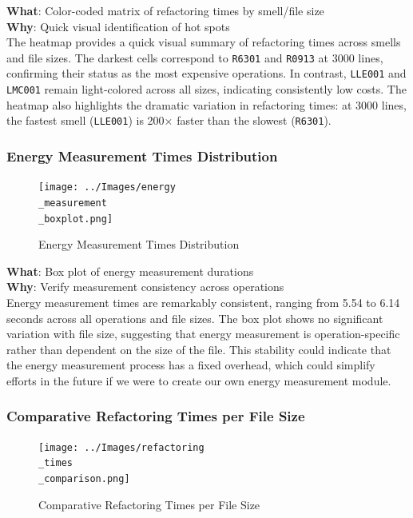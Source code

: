 \documentclass[12pt, titlepage]{article}
\begin{document}
\noindent \textbf{What}: Color-coded matrix of refactoring times by
smell/file size\\

\noindent \textbf{Why}: Quick visual identification of hot spots\\

The heatmap provides a quick visual summary of refactoring times
across smells and file sizes. The darkest cells correspond to
\texttt{R6301} and \texttt{R0913} at 3000 lines, confirming their
status as the most expensive operations. In contrast, \texttt{LLE001}
and \texttt{LMC001} remain light-colored across all sizes, indicating
consistently low costs. The heatmap also highlights the dramatic
variation in refactoring times: at 3000 lines, the fastest smell
(\texttt{LLE001}) is 200× faster than the slowest (\texttt{R6301}).

\subsubsection{Energy Measurement Times Distribution}
\begin{figure}[H]
  \centering
  \texttt{[image: ../Images/energy\\\_measurement\\\_boxplot.png]}
  \caption{Energy Measurement Times Distribution}
\end{figure}

\noindent \textbf{What}: Box plot of energy measurement durations\\

\noindent \textbf{Why}: Verify measurement consistency across operations\\

Energy measurement times are remarkably consistent, ranging from 5.54
to 6.14 seconds across all operations and file sizes.
The box plot shows no significant variation with file size,
suggesting that energy measurement is operation-specific
rather than dependent on the size of the file. This stability could
indicate that the energy measurement process has a fixed
overhead, which could simplify efforts in the future if we were to
create our own energy measurement module.

\subsubsection{Comparative Refactoring Times per File Size}
\begin{figure}[H]
  \centering
  \texttt{[image: ../Images/refactoring\\\_times\\\_comparison.png]}
  \caption{Comparative Refactoring Times per File Size}
\end{figure}
\end{document}
